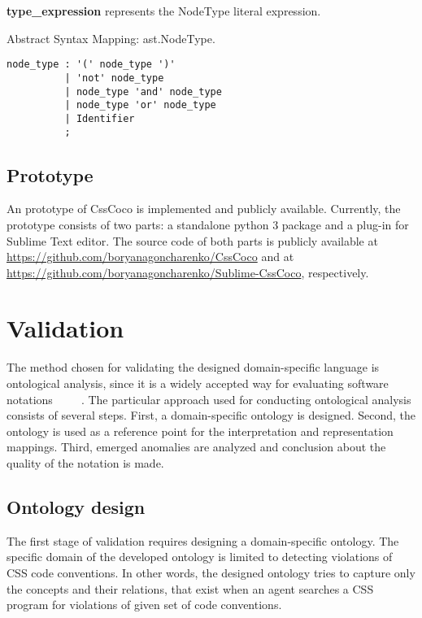 \documentclass[parskip=full]{uvamscse}
\begin{document}
\begin{description}
\item\textbf{type\_expression} represents the NodeType literal expression.

Abstract Syntax Mapping: ast.NodeType.

\begin{snippet}
\begin{verbatim}
node_type : '(' node_type ')'
          | 'not' node_type
          | node_type 'and' node_type
          | node_type 'or' node_type
          | Identifier
          ;
\end{verbatim}
\end{snippet}

\end{description}

\subsection{Prototype}

An prototype of CssCoco is implemented and publicly available. Currently, the prototype consists of
two parts: a standalone python 3 package and a plug-in for Sublime Text editor. The source code of
both parts is publicly available at \url{https://github.com/boryanagoncharenko/CssCoco} and at
\url{https://github.com/boryanagoncharenko/Sublime-CssCoco}, respectively.

\section{Validation}

The method chosen for validating the designed domain-specific language is ontological analysis,
since it is a widely accepted way for evaluating software notations~\cite{opdahl2002ontological}~\cite{green2000integrated}~\cite{moody2009physics}~\cite{parsons1997using}~\cite{weber1996analytical}.
The particular approach used for conducting ontological analysis consists of several steps. First, a
domain-specific ontology is designed. Second, the ontology is used as a reference point for the
interpretation and representation mappings. Third, emerged anomalies are analyzed and conclusion
about the quality of the notation is made.

\subsection{Ontology design}

The first stage of validation requires designing a domain-specific ontology. The specific domain of
the developed ontology is limited to detecting violations of CSS code conventions. In other words,
the designed ontology tries to capture only the concepts and their relations, that exist when an
agent searches a CSS program for violations of given set of code conventions.
\end{document}
